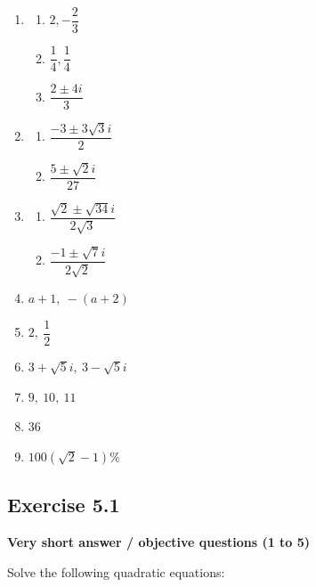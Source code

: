 \documentclass[12pt,a4paper]{article}
\begin{document}
\begin{enumerate}[label=Example \arabic*.]
    \item 
    \begin{enumerate}[label=(\roman*)]
        \item \( 2, -\dfrac{2}{3} \)
        \item \( \dfrac{1}{4}, \dfrac{1}{4} \)
        \item \( \dfrac{2 \pm 4i}{3} \)
    \end{enumerate}

    \item 
    \begin{enumerate}[label=(\roman*)]
        \item \( \dfrac{-3 \pm 3\sqrt{3}i}{2} \)
        \item \( \dfrac{5 \pm \sqrt{2}i}{27} \)
    \end{enumerate}

    \item 
    \begin{enumerate}[label=(\roman*)]
        \item \( \dfrac{\sqrt{2} \pm \sqrt{34}i}{2\sqrt{3}} \)
        \item \( \dfrac{-1 \pm \sqrt{7}i}{2\sqrt{2}} \)
    \end{enumerate}

    \item \( a + 1,\ -(a + 2) \)

    \item \( 2,\ \dfrac{1}{2} \)

    \item \( 3 + \sqrt{5}i,\ 3 - \sqrt{5}i \)

    \item \( 9,\ 10,\ 11 \)

    \item \( 36 \)

    \item \( 100(\sqrt{2} - 1)\% \)
\end{enumerate}

\subsection{Exercise 5.1}

\textbf{Very short answer / objective questions (1 to 5)}

Solve the following quadratic equations:
\end{document}
